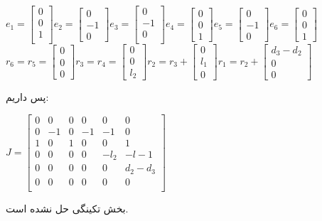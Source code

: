 \documentclass[12pt]{article}
\begin{document}
\begin{latin}
	~\\
	$
	e_1 = \begin{bmatrix}
		0 \\
		0 \\
		1\\
	\end{bmatrix}
	e_2 = \begin{bmatrix}
		0 \\
		-1 \\
		0
	\end{bmatrix}
	e_3 = \begin{bmatrix}
	0 \\
	-1 \\
	0 \\
\end{bmatrix}
	e_4 = \begin{bmatrix}
	0 \\
	0\\
	1
\end{bmatrix}
	e_5 = \begin{bmatrix}
	0 \\
	-1\\
	0
\end{bmatrix}
	e_6 = \begin{bmatrix}
	0 \\
	0\\
	1
\end{bmatrix}
	$
	\\
	$
	r_6 = r_5 = \begin{bmatrix}
		0 \\
		0 \\
		0
	\end{bmatrix}
	r_3 = r_4 = \begin{bmatrix}
		0 \\
		0 \\
		l_2
	\end{bmatrix}
		r_2 = r_3 +  \begin{bmatrix}
		0 \\
		l_1 \\
		0
	\end{bmatrix}
	r_1 = r_2 + \begin{bmatrix}
		d_3 - d_2 \\
		0 \\
		0
	\end{bmatrix}
	$
\end{latin}
پس داریم:
\begin{latin}
	$
	J = \begin{bmatrix}
		0 & 0 & 0 & 0 & 0 & 0 \\
		0 & -1 & 0 & -1 & -1 & 0   \\
		1 & 0 & 1 & 0 & 0 & 1 \\
		0 & 0 & 0 & 0 & -l_2 & -l-1  \\
		0 & 0 & 0 & 0 & 0 &  d_2 - d_3 \\
		0 & 0 & 0 & 0 & 0 & 0 \\
	\end{bmatrix}
	$
\end{latin}
 بخش تکینگی حل نشده است.
\end{document}
